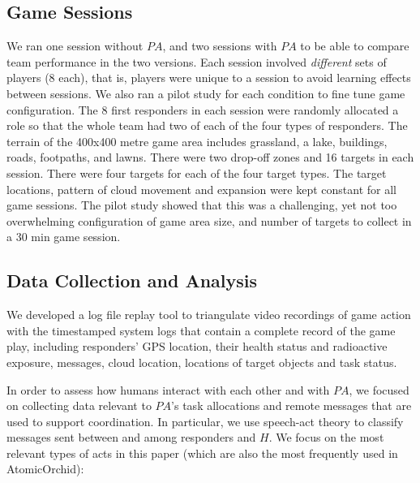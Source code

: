 \subsection{Game Sessions}
\noindent We ran one session without $PA$, and two sessions with $PA$ to be able to compare team performance in the two versions. Each session involved \emph{different} sets of players (8 each), that is, players were unique to a session to avoid learning effects between sessions. We also ran a pilot study for each condition to fine tune game configuration. The 8 first responders in each session were randomly allocated a role so that the whole team had two of each of the four types of responders. The terrain of the 400x400 metre  game area includes grassland, a lake, buildings, roads,  footpaths, and lawns. There were two  drop-off zones and 16 targets in each session. There were four targets for each of the four target types. The target locations, pattern of cloud movement and expansion were kept constant for all game sessions. The pilot study showed that this was a challenging, yet not too overwhelming configuration of game area size, and number of targets to collect in a 30 min game session. 

\subsection{Data Collection and Analysis}
\noindent We developed a log file replay tool to triangulate video recordings of game action with the timestamped system logs that contain a complete record of the game play, including responders' GPS location, their health status and radioactive exposure, messages, cloud location, locations of target objects and task status.


In order to assess how humans interact with each other and with $PA$, we focused on collecting data relevant to $PA$'s task allocations and remote messages  that are used to support coordination. In particular, we use speech-act theory \cite{searle:1975} to classify messages sent between and among responders and $H$. We focus on the most relevant types of acts in this paper (which are also the most frequently used in AtomicOrchid):

